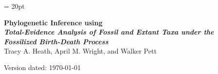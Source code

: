 \documentclass[11pt]{article}
\begin{document}
\renewcommand{\headrulewidth}{0.5pt}
\headsep = 20pt
\lhead{ }

\thispagestyle{plain}
\begin{center}

\textbf{\LARGE Phylogenetic Inference using \RevBayes}\\\vspace{2mm}
\textbf{\it{\Large Total-Evidence Analysis of Fossil and Extant Taxa under the Fossilized Birth-Death Process}}\\\vspace{2mm}
\vspace{1cm}
{\Large Tracy A. Heath, April M. Wright, and Walker Pett}
\vspace{1cm}
\end{center}

\def \ResourcePath {./}
\def \GlobalResourcePath {../}


Version dated: \today
\end{document}
